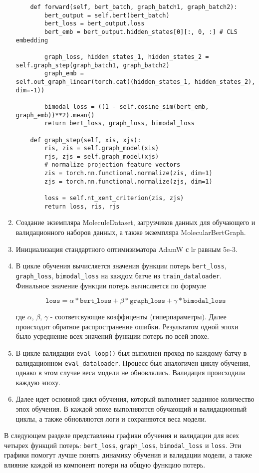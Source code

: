\begin{enumerate}
\begin{lstlisting}
    def forward(self, bert_batch, graph_batch1, graph_batch2):
        bert_output = self.bert(bert_batch)
        bert_loss = bert_output.loss
        bert_emb = bert_output.hidden_states[0][:, 0, :] # CLS embedding 

        graph_loss, hidden_states_1, hidden_states_2 = self.graph_step(graph_batch1, graph_batch2)
        graph_emb = self.out_graph_linear(torch.cat((hidden_states_1, hidden_states_2), dim=-1))

        bimodal_loss = ((1 - self.cosine_sim(bert_emb, graph_emb))**2).mean()
        return bert_loss, graph_loss, bimodal_loss

    def graph_step(self, xis, xjs):
        ris, zis = self.graph_model(xis)
        rjs, zjs = self.graph_model(xjs)
        # normalize projection feature vectors
        zis = torch.nn.functional.normalize(zis, dim=1)
        zjs = torch.nn.functional.normalize(zjs, dim=1)
        
        loss = self.nt_xent_criterion(zis, zjs)
        return loss, ris, rjs
    \end{lstlisting}
    \item Cоздание экземпляра MoleculeDataset, загрузчиков данных для обучающего и валидационного наборов данных, а также экземпляра MolecularBertGraph.
    \item Инициализация стандартного оптимизиматора AdamW с lr равным 5e-3.
    \item В цикле обучения вычисляется значения функции потерь \texttt{bert\_loss}, \texttt{graph\_loss}, \texttt{bimodal\_loss} на каждом батче из \texttt{train\_dataloader}. Финальное значение функции потерь вычисляется по формуле 
    
    $$\texttt{loss} = \alpha * \texttt{bert\_loss} + \beta * \texttt{graph\_loss} + \gamma * \texttt{bimodal\_loss}$$ 
    
    где $\alpha$, $\beta$, $\gamma$ - соответсвующие коэффиценты (гиперпараметры). Далее происходит обратное распространение ошибки. Результатом одной эпохи было усреднение всех значений функции потерь по всей эпохе.

    \item В цикле валидации \texttt{eval\_loop()} был выполнен проход по каждому батчу в валидационном \texttt{eval\_dataloader}. Процесс был аналогичен циклу обучения, однако в этом случае веса модели не обновлялись. Валидация происходила каждую эпоху.
    
    \item Далее идет основной цикл обучения, который выполняет заданное количество эпох обучения. В каждой эпохе выполняются обучающий и валидационный циклы, а также обновляются логи и сохраняются веса модели.

\end{enumerate}
В следующем разделе представлены графики обучения и валидации для всех четырех функций потерь: \texttt{bert\_loss}, \texttt{graph\_loss}, \texttt{bimodal\_loss} и \texttt{loss}. Эти графики помогут лучше понять динамику обучения и валидации модели, а также влияние каждой из компонент потери на общую функцию потерь.

